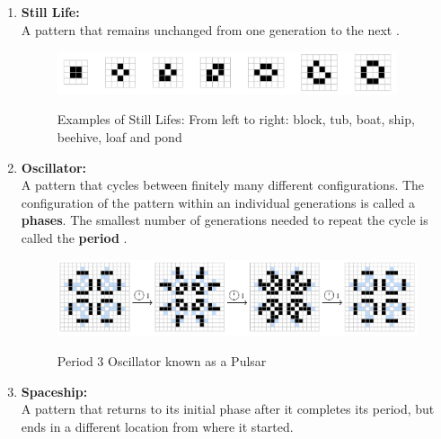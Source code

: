 \documentclass{article}
\theoremstyle{definition}
\theoremstyle{plain}
\theoremstyle{plain}
\begin{document}
\begin{enumerate}
  \item \textbf{Still Life: } \\ A pattern that remains unchanged from one generation to the next \cite{JG2022conway}.

 \begin{figure}[ht]
          \centering
    \includegraphics[width=10cm]{figures/figure_two.png}
    \label{stil_lifes}
    \caption{Examples of Still Lifes: From left to right: block, tub, boat, ship, beehive, loaf and pond}
    \cite{JG2022conway}
\end{figure}


  \item \textbf{Oscillator: } \\ A pattern that cycles between finitely many different configurations. The configuration of the pattern within an individual generations is called a \textbf{phases}. The smallest number of generations needed to repeat the cycle is called the \textbf{period} \cite{JG2022conway}.



 \begin{figure}[ht]
          \centering
    \includegraphics[width=14cm]{figures/figure_three.png}
    \caption{Period 3 Oscillator known as a Pulsar}
    \cite{JG2022conway}
\end{figure}




\label{spaceship_def}
  \item \textbf{Spaceship: } \\ A pattern that returns to its initial phase after it completes its period, but ends in a different location from where it started. \cite{JG2022conway}
\end{enumerate}
\end{document}
